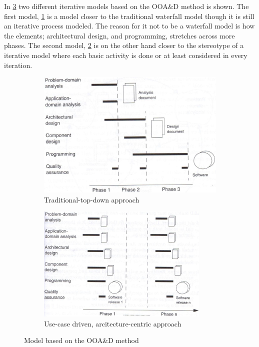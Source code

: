 
In \cref{fig:SUModels} two different iterative models based on the OOA\&D method is shown.
The first model, \cref{fig:SUModel1} is a model closer to the traditional waterfall model though it is still an iterative process modeled.
The reason for it not to be a waterfall model is how the elements; architectural design, and programming, stretches across more phases.
The second model, \cref{fig:SUModel2} is on the other hand closer to the stereotype of a iterative model where each basic activity is done or at least considered in every iteration.

\begin{figure}[H]
	\centering
	\begin{subfigure}[b]{0.48\textwidth}
		\includegraphics[width=\textwidth]{billeder/SUModel1.jpg}
		\caption{Traditional-top-down approach \citep[p.~16]{Rod-Aalborg}}
		\label{fig:SUModel1}
	\end{subfigure}
	\quad
	\begin{subfigure}[b]{0.48\textwidth}
		\includegraphics[width=0.9\textwidth]{billeder/SUModel2.jpg}
		\caption{Use-case driven, arcitecture-centric approach \citep[p.~17]{Rod-Aalborg}}
		\label{fig:SUModel2}
	\end{subfigure}
	\caption{Model based on the OOA\&D method}\label{fig:SUModels}
\end{figure}
